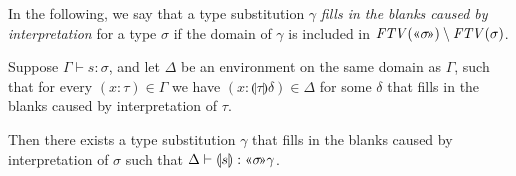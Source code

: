 \documentclass[runningheads,a4paper]{llncs}
\newcommand{\typeinterpret}[1]{\text{\guillemotleft} #1\! \text{\guillemotright}}
\newcommand{\interpret}[1]{\llparenthesis #1 \rrparenthesis}
\newcommand{\FTV}{\mathit{FTV}}
\begin{document}
In the following, we say that a type substitution $\gamma$ \emph{fills
in the blanks caused by interpretation} for a type $\sigma$ if the
domain of $\gamma$ is included in $\FTV(\typeinterpret{\sigma})
\setminus \FTV(\sigma)$.

\begin{lemma}
Suppose $\Gamma \vdash s : \sigma$, and let $\Delta$ be an environment
on the same domain as $\Gamma$, such that for every $(x : \tau) \in
\Gamma$
we have $(x : \interpret{\tau}\delta) \in \Delta$ for some $\delta$ that
fills in the blanks caused by interpretation of $\tau$.

Then there exists a type substitution $\gamma$
that fills in the blanks caused by interpretation of $\sigma$ such that
$\Delta \vdash \interpret{s} : \typeinterpret{\sigma}\gamma$.
\end{lemma}
\end{document}
